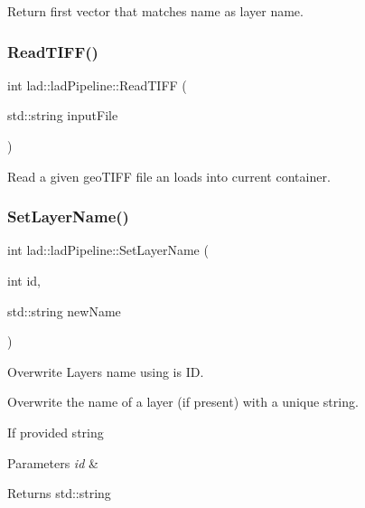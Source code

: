 Return first vector that matches \textquotesingle{}name\textquotesingle{} as layer name. 

\mbox{\label{classlad_1_1lad_pipeline_a60959c4c046e112741f87fa37fa08d9b}} 
\subsubsection{\texorpdfstring{Read\+T\+I\+F\+F()}{ReadTIFF()}}
{\footnotesize\ttfamily int lad\+::lad\+Pipeline\+::\+Read\+T\+I\+FF (\begin{DoxyParamCaption}\item[{std\+::string}]{input\+File }\end{DoxyParamCaption})}



Read a given geo\+T\+I\+FF file an loads into current container. 

\mbox{\label{classlad_1_1lad_pipeline_a05a4d4197caa86b14bbbfe53237bfab0}} 
\subsubsection{\texorpdfstring{Set\+Layer\+Name()}{SetLayerName()}}
{\footnotesize\ttfamily int lad\+::lad\+Pipeline\+::\+Set\+Layer\+Name (\begin{DoxyParamCaption}\item[{int}]{id,  }\item[{std\+::string}]{new\+Name }\end{DoxyParamCaption})}



Overwrite Layers name using is ID. 

Overwrite the name of a layer (if present) with a unique string.

If provided string 
\begin{DoxyParams}{Parameters}
{\em id} & \\
\hline
\end{DoxyParams}
\begin{DoxyReturn}{Returns}
std\+::string 
\end{DoxyReturn}


